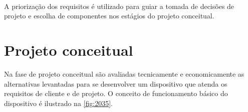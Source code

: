 \begin{table}[H]
    \caption{Prioridade dos requisitos definidos pela matriz QFD}
    \label{tab:resultqfd}
    \centering
\
\end{table}

A priorização dos requisitos é utilizado para guiar a tomada de decisões de projeto e escolha de componentes nos estágios do projeto conceitual.

\section{Projeto conceitual}

Na fase de projeto conceitual são avaliadas tecnicamente e economicamente as alternativas levantadas para se desenvolver um dispositivo que atenda os requisitos de cliente e de projeto.
O conceito de funcionamento básico do dispositivo é ilustrado na \autoref{fig:2035}.

